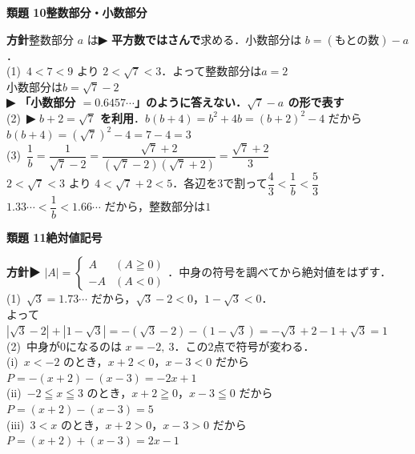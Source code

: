 \documentclass[a4paper,11pt]{ltjsarticle}
\newcommand{\ans}[2]{\Needspace{5\baselineskip}\vspace{6pt}%
  {\sffamily\bfseries 類題 #1\quad #2}\par}
\newcommand{\point}[1]{\textsf{\bfseries ▶ #1}}
\begin{document}
\ans{10}{整数部分・小数部分}
\begin{kai}
\textbf{方針}\quad 整数部分 $a$ は\point{平方数ではさんで}求める．小数部分は $b=(\text{もとの数})-a$．\\[2pt]
(1)\ $4<7<9$ より $2<\sqrt7<3$．よって整数部分は\quad $a=2$\\
\hspace*{1.5em}小数部分は\quad $b=\sqrt7-2$\\
\hspace*{1.5em}\point{「小数部分 $=0.6457\cdots$」のように答えない．$\sqrt7-a$ の形で表す}\\[2pt]
(2)\ \point{$b+2=\sqrt7$ を利用}．$b(b+4)=b^2+4b=(b+2)^2-4$ だから\\
\hspace*{1.5em}$b(b+4)=(\sqrt7)^2-4=7-4=3$\\[2pt]
(3)\ $\dfrac1b=\dfrac1{\sqrt7-2}=\dfrac{\sqrt7+2}{(\sqrt7-2)(\sqrt7+2)}=\dfrac{\sqrt7+2}{3}$\\[2pt]
\hspace*{1.5em}$2<\sqrt7<3$ より $4<\sqrt7+2<5$．各辺を3で割って\quad $\dfrac43<\dfrac1b<\dfrac53$\\[2pt]
\hspace*{1.5em}$1.33\cdots<\dfrac1b<1.66\cdots$ だから，整数部分は\quad $1$
\end{kai}

\ans{11}{絶対値記号}
\begin{kai}
\textbf{方針}\quad \point{$|A|=\begin{cases}A & (A\geqq0)\\ -A & (A<0)\end{cases}$}．中身の符号を調べてから絶対値をはずす．\\[2pt]
(1)\ $\sqrt3=1.73\cdots$ だから，$\sqrt3-2<0$，\quad $1-\sqrt3<0$．\\
\hspace*{1.5em}よって\quad $|\sqrt3-2|+|1-\sqrt3|=-(\sqrt3-2)-(1-\sqrt3)=-\sqrt3+2-1+\sqrt3=1$\\[2pt]
(2)\ 中身が0になるのは $x=-2,\ 3$．この2点で符号が変わる．\\
\hspace*{1.5em}(i)\ $x<-2$ のとき，$x+2<0$，$x-3<0$ だから\\
\hspace*{3em}$P=-(x+2)-(x-3)=-2x+1$\\
\hspace*{1.5em}(ii)\ $-2\leqq x\leqq3$ のとき，$x+2\geqq0$，$x-3\leqq0$ だから\\
\hspace*{3em}$P=(x+2)-(x-3)=5$\\
\hspace*{1.5em}(iii)\ $3<x$ のとき，$x+2>0$，$x-3>0$ だから\\
\hspace*{3em}$P=(x+2)+(x-3)=2x-1$
\end{kai}
\end{document}
